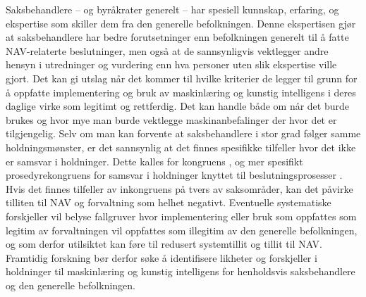 \documentclass[
  12pt,
  a4paper, 12pt]{article}
\begin{document}
Saksbehandlere -- og byråkrater generelt -- har spesiell kunnskap, erfaring, og ekspertise som skiller dem fra den generelle befolkningen.
Denne ekspertisen gjør at saksbehandlere har bedre forutsetninger enn befolkningen generelt til å fatte NAV-relaterte beslutninger, men også at de sannsynligvis vektlegger andre hensyn i utredninger og vurdering enn hva personer uten slik ekspertise ville gjort.
Det kan gi utslag når det kommer til hvilke kriterier de legger til grunn for å oppfatte implementering og bruk av maskinlæring og kunstig intelligens i deres daglige virke som legitimt og rettferdig.
Det kan handle både om når det burde brukes og hvor mye man burde vektlegge maskinanbefalinger der hvor det er tilgjengelig.
Selv om man kan forvente at saksbehandlere i stor grad følger samme holdningsmønster, er det sannsynlig at det finnes spesifikke tilfeller hvor det ikke er samsvar i holdninger.
Dette kalles for kongruens \citep{golder2010ideological}, og mer spesifikt prosedyrekongruens for samsvar i holdninger knyttet til beslutningsprosesser \citep{BroderstadTroySaghaug2022DR:T}.
Hvis det finnes tilfeller av inkongruens på tvers av saksområder, kan det påvirke tilliten til NAV og forvaltning som helhet negativt.
Eventuelle systematiske forskjeller vil belyse fallgruver hvor implementering eller bruk som oppfattes som legitim av forvaltningen vil oppfattes som illegitim av den generelle befolkningen, og som derfor utilsiktet kan føre til redusert systemtillit og tillit til NAV.
Framtidig forskning bør derfor søke å identifisere likheter og forskjeller i holdninger til maskinlæring og kunstig intelligens for henholdsvis saksbehandlere og den generelle befolkningen.

\newpage

  
\end{document}
